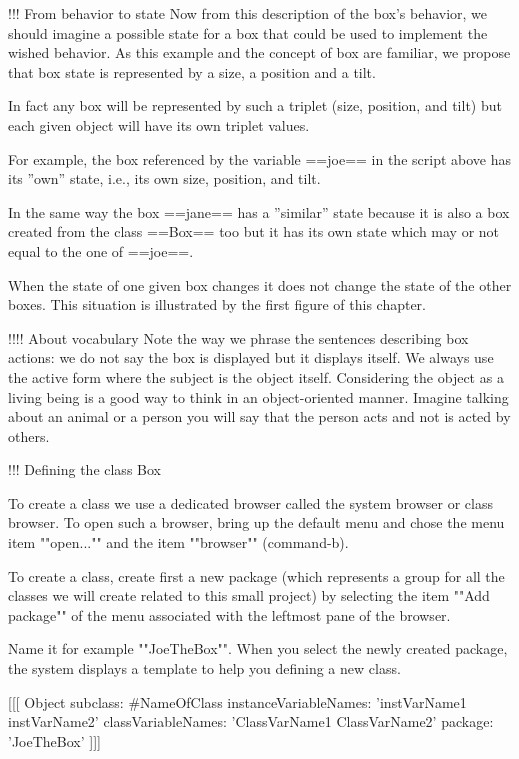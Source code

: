 !!! From behavior to state
Now from this description of the box's behavior, we should imagine a possible state for a box that could be used to implement the wished behavior.  As this example and the concept of box are familiar, we propose that box state is
represented by a size, a position and a tilt.

In fact any box will be represented by such a triplet (size, position, and tilt) but each given object will have its own triplet values.  

For example, the box referenced by the variable ==joe== in the script above has its ''own'' state, i.e., its own
size, position, and tilt.  

In the same way the box ==jane== has a ''similar'' state because it is also a box created from the class ==Box== too but it has its own state which may or not equal to the one of ==joe==.  

When the state of one given box changes it does not change the state of the other boxes.  This situation is illustrated by the first figure of this chapter.  

!!!! About vocabulary
Note the way we phrase the sentences describing box actions:  we do
not say the box is displayed but it displays itself.  We always use
the active form where the subject is the object itself.  Considering
the object as a living being is a good way to think in an
object-oriented manner.  Imagine talking about an animal or a person
you will say that the person acts and not is acted by others.  



!!! Defining the class Box

To create a class we use a dedicated browser called the system browser
 or class browser.  To open such a browser, bring up the default menu and chose the menu item ""open..."" and the item ""browser"" (command-b).


To create a class, create first a new package (which represents a
group for all the classes we will create related to this small
project) by selecting the item ""Add package"" of the menu associated with the
leftmost pane of the browser. 

Name it for example ""JoeTheBox"".  When you select the newly created package,
the system displays a template to help you defining a new class. 

[[[
Object subclass: #NameOfClass
   instanceVariableNames: 'instVarName1 instVarName2'
   classVariableNames: 'ClassVarName1 ClassVarName2'
   package: 'JoeTheBox'
]]]


